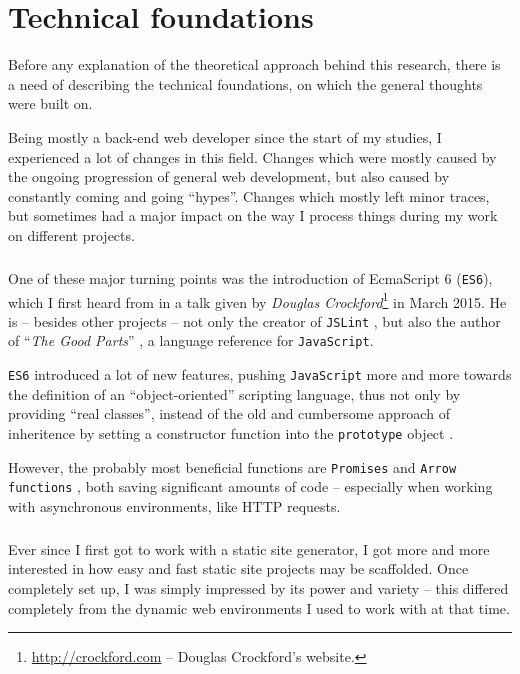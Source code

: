 \chapter{Technical foundations}
\label{cha:technicalfoundations}

Before any explanation of the theoretical approach behind this research, there is a need of describing the technical foundations, on which the general thoughts were built on.

Being mostly a back-end web developer since the start of my studies, I experienced a lot of changes in this field. Changes which were mostly caused by the ongoing progression of general web development, but also caused by constantly coming and going ``hypes''. Changes which mostly left minor traces, but sometimes had a major impact on the way I process things during my work on different projects.

\paragraph{} %
One of these major turning points was the introduction of EcmaScript 6 (\texttt{ES6}), which I first heard from in a talk given by \emph{Douglas Crockford}\footnote{\url{http://crockford.com} -- Douglas Crockford's website.} in March 2015. He is -- besides other projects -- not only the creator of \texttt{JSLint} \cite{JSLintDocumentation}, but also the author of ``\emph{The Good Parts}'' \cite{crockford2008javascript}, a language reference for \texttt{JavaScript}.

\texttt{ES6} introduced a lot of new features, pushing \texttt{JavaScript} more and more towards the definition of an ``object-oriented'' scripting language, thus not only by providing ``real classes'', instead of the old and cumbersome approach of inheritence by setting a constructor function into the \texttt{prototype} object \cite[47]{crockford2008javascript}.

However, the probably most beneficial functions are \texttt{Promises} \cite{MDNPromise} and \texttt{Arrow functions} \cite{MDNArrowFunctions}, both saving significant amounts of code -- especially when working with asynchronous environments, like HTTP requests.

\paragraph{} %
Ever since I first got to work with a static site generator, I got more and more interested in how easy and fast static site projects may be scaffolded. Once completely set up, I was simply impressed by its power and variety -- this differed completely from the dynamic web environments I used to work with at that time.


